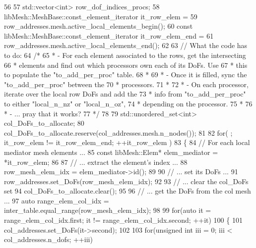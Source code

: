 \begin{DoxyCode}
56 
57     std::vector<int> row\_dof\_indices\_procs;
58     libMesh::MeshBase::const\_element\_iterator it\_row\_elem =
59             row\_addresses.mesh.active\_local\_elements\_begin();
60     \textcolor{keyword}{const} libMesh::MeshBase::const\_element\_iterator     it\_row\_elem\_end =
61             row\_addresses.mesh.active\_local\_elements\_end();
62 
63     \textcolor{comment}{// What the code has to do:}
64     \textcolor{comment}{/*}
65 \textcolor{comment}{     *      - For each element associated to the rows, get the intersecting}
66 \textcolor{comment}{     *        elements and find out which processors own each of its DoFs. Use}
67 \textcolor{comment}{     *        this to populate the "to\_add\_per\_proc" table.}
68 \textcolor{comment}{     *}
69 \textcolor{comment}{     *      - Once it is filled, sync the "to\_add\_per\_proc" between the}
70 \textcolor{comment}{     *        processors.}
71 \textcolor{comment}{     *}
72 \textcolor{comment}{     *      - On each processor, iterate over the local row DoFs and add the}
73 \textcolor{comment}{     *        info from "to\_add\_per\_proc" to either "local\_n\_nz" or "local\_n\_oz",}
74 \textcolor{comment}{     *        depending on the processor.}
75 \textcolor{comment}{     *}
76 \textcolor{comment}{     *      - ... pray that it works?}
77 \textcolor{comment}{     */}
78 
79     std::unordered\_set<int> col\_DoFs\_to\_allocate;
80     col\_DoFs\_to\_allocate.reserve(col\_addresses.mesh.n\_nodes());
81 
82     \textcolor{keywordflow}{for}( ; it\_row\_elem != it\_row\_elem\_end; ++it\_row\_elem )
83     \{
84         \textcolor{comment}{// For each local mediator mesh elements ...}
85         \textcolor{keyword}{const} libMesh::Elem* elem\_mediator = *it\_row\_elem;
86 
87         \textcolor{comment}{// ... extract the element's index ...}
88         row\_mesh\_elem\_idx = elem\_mediator->id();
89 
90         \textcolor{comment}{// ... set its DoFs ...}
91         row\_addresses.set\_DoFs(row\_mesh\_elem\_idx);
92 
93         \textcolor{comment}{// ... clear the col\_DoFs set}
94         col\_DoFs\_to\_allocate.clear();
95 
96         \textcolor{comment}{// ... get the DoFs from the col mesh ...}
97         \textcolor{keyword}{auto} range\_elem\_col\_idx = inter\_table.equal\_range(row\_mesh\_elem\_idx);
98 
99         \textcolor{keywordflow}{for}(\textcolor{keyword}{auto} it = range\_elem\_col\_idx.first; it != range\_elem\_col\_idx.second; ++it)
100         \{
101             col\_addresses.set\_DoFs(it->second);
102 
103             \textcolor{keywordflow}{for}(\textcolor{keywordtype}{unsigned} \textcolor{keywordtype}{int} iii = 0; iii < col\_addresses.n\_dofs; ++iii)

\end{DoxyCode}
